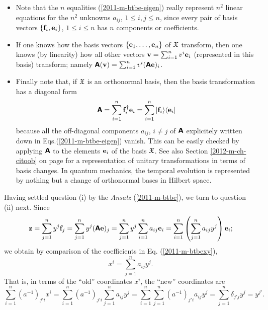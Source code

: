 \begin{itemize}
\item
Note   that the $n$ equalities (\ref {2011-m-btbe-eigen})
really represent $n^2$ linear equations for the $n^2$
unknowns $a_{ij}$, $1\le i,j\le n$, since every pair of basis vectors
$\{{\bf f}_i,{\bf e}_i\}$, $1\le i\le n$ has $n$ components or coefficients.

\item
If one knows how the basis vectors
$
\{
{\bf e}_1,
\ldots ,
{\bf e}_n
\}$ of ${\frak X}$    transform, then one knows (by linearity) how
all other vectors
${\bf v}=
\sum_{i=1}^n v^i{\bf e}_i
$
(represented in this basis) transform; namely
$\textsf{\textbf{A}}({\bf v})=
\sum_{i=1}^n v^i (\textsf{\textbf{A}}{\bf e})_i
$.

\item
Finally note that, if  ${\frak X}$ is an orthonormal basis,
then the basis transformation has a diagonal form
\begin{equation}
\textsf{\textbf{A}} =   \sum_{i=1}^n  {\bf f}_i^\dagger  {\bf e}_i
=
\sum_{i=1}^n \vert {\bf f}_i \rangle \langle {\bf e}_i \vert
\label{2013-m-ch-fdvs-dftm}
\end{equation}
because all the off-diagonal components $a_{ij}$, $i\neq j$ of $\textsf{\textbf{A}}$
explicitely written down in Eqs.(\ref{2011-m-btbe-eigen}) vanish.
This can be easily checked by applying $\textsf{\textbf{A}}$ to the elements ${\bf e}_i $ of the basis ${\frak X}$.
See also Section
\ref{2012-m-ch-citoob} on page \pageref{2012-m-ch-citoob}
for a representation of unitary transformations in terms of basis changes.
In quantum mechanics, the temporal evolution is represented by nothing but a change of orthonormal bases in Hilbert space.
\end{itemize}

Having settled question (i) by the {\it Ansatz}
(\ref{2011-m-btbe}),
we turn to question (ii) next.
Since
$${\bf z} =
 \sum_{j=1}^n y^j {\bf f}_j=
 \sum_{j=1}^n  y^j (\textsf{\textbf{A}}{\bf e})_j=
 \sum_{j=1}^n  y^j  \sum_{i=1}^n a_{ij}{\bf e}_i=
  \sum_{i=1}^n \left(\sum_{j=1}^n  a_{ij}y^j \right)   {\bf e}_i;
$$
we obtain by comparison of the coefficients in Eq. (\ref{2011-m-btbexy}),
\begin{equation}
x^i= \sum_{j=1}^n  a_{ij}y^j.
\label{2012-m-ch-e-tl1}
\end{equation}
That is, in terms of the ``old'' coordinates $x^i$,
the ``new'' coordinates are
\begin{equation}
\sum_{i=1}^n (a^{-1})_{j' i} x^i= \sum_{i=1}^n (a^{-1})_{j' i}\sum_{j=1}^n  a_{ij}y^j
=  \sum_{i=1}^n \sum_{j=1}^n (a^{-1})_{j' i} a_{ij}y^j
=   \sum_{j=1}^n \delta_{j' j}y^j
=  y^{j'}
.
\label{2012-m-ch-e-tl2}
\end{equation}

